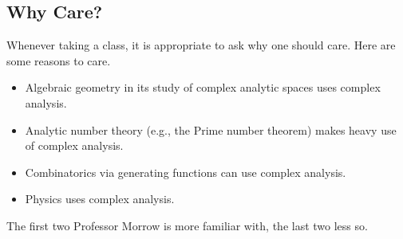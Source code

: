 \documentclass[../notes.tex]{subfiles}
\begin{document}
\subsection{Why Care?}
Whenever taking a class, it is appropriate to ask why one should care. Here are some reasons to care.
\begin{itemize}
	\item Algebraic geometry in its study of complex analytic spaces uses complex analysis.
	\item Analytic number theory (e.g., the Prime number theorem) makes heavy use of complex analysis.
	\item Combinatorics via generating functions can use complex analysis.
	\item Physics uses complex analysis.
\end{itemize}
The first two Professor Morrow is more familiar with, the last two less so.
\end{document}
